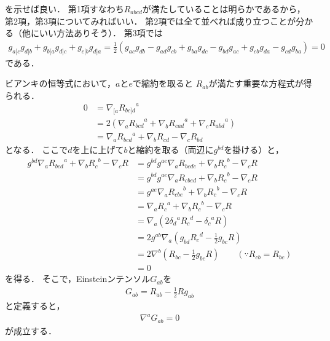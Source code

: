 \documentclass[a4paper]{jsarticle}
\begin{document}
を示せば良い．
第1項すなわち$R_{abcd}$が満たしていることは明らかであるから，
第2項，第3項についてみればいい．
第2項では全て並べれば成り立つことが分かる（他にいい方法ありそう）．
第3項では
\begin{align}
	g_{a[c} g_{d]b} + g_{b[a} g_{d]c} + g_{c[b} g_{d]a}
	= \frac{1}{2} \left(
		g_{ac} g_{db} - g_{ad} g_{cb} + g_{ba} g_{dc} - g_{bd} g_{ac}
		+ g_{cb} g_{da} - g_{cd} g_{ba}
	\right) = 0
\end{align}
である．

ビアンキの恒等式において，$a$と$e$で縮約を取ると
$R_{ab}$が満たす重要な方程式が得られる．
\begin{align}
	0 &= \nabla_{[a} {R_{bc]d}}^a \\
	&= 2 \left(
		\nabla_a {R_{bcd}}^a + \nabla_b {R_{cad}}^a + \nabla_c {R_{abd}}^a
	\right)　\\
	&= \nabla_a {R_{bcd}}^a + \nabla_b R_{cd} - \nabla_c R_{bd}
\end{align}
となる．
ここで$d$を上に上げて$b$と縮約を取る（両辺に$g^{bd}$を掛ける）と，
\begin{align}
	g^{bd} \nabla_a {R_{bcd}}^a + \nabla_b {R_c}^b - \nabla_c R
	&= g^{bd} g^{ae} \nabla_a R_{bcde} + \nabla_b {R_c}^b - \nabla_c R \\
	&= g^{bd} g^{ae} \nabla_a R_{cbed} + \nabla_b {R_c}^b - \nabla_c R \\
	&= g^{ae} \nabla_a {R_{cbe}}^b + \nabla_b {R_c}^b - \nabla_c R \\
	&= \nabla_a {R_c}^a + \nabla_b {R_c}^b - \nabla_c R \\
	&= \nabla_a \left( 2 {\delta_d}^a {R_c}^d - {\delta_c}^a R \right) \\
	&= 2g^{ab} \nabla_a \left( g_{bd} {R_c}^d - \frac{1}{2} g_{bc}R \right) \\
	&= 2\nabla^b \left( R_{bc} - \frac{1}{2} g_{bc} R \right) 
	\qquad \left( \because R_{cb} = R_{bc} \right)\\
	&= 0
\end{align}
を得る．
そこで，Einsteinンテンソル$G_{ab}$を
\begin{align}
	G_{ab} = R_{ab} - \frac{1}{2}R g_{ab}
\end{align}
と定義すると，
\begin{align}
	\nabla^a G_{ab} = 0
\end{align}
が成立する．
\end{document}
